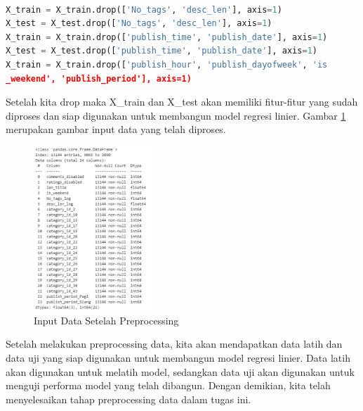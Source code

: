 \begin{lstlisting}[language=Python, caption=Drop Fitur Original]

X_train = X_train.drop(['No_tags', 'desc_len'], axis=1)
X_test = X_test.drop(['No_tags', 'desc_len'], axis=1)
X_train = X_train.drop(['publish_time', 'publish_date'], axis=1)
X_test = X_test.drop(['publish_time', 'publish_date'], axis=1)
X_train = X_train.drop(['publish_hour', 'publish_dayofweek', 'is
_weekend', 'publish_period'], axis=1)
\end{lstlisting}
\newpage
Setelah kita drop maka X\_train dan X\_test akan memiliki fitur-fitur yang sudah diproses dan siap digunakan untuk membangun model regresi linier. Gambar \ref{fig:input_data} merupakan gambar input data yang telah diproses.

\begin{figure}[ht]
    \centering
    \includegraphics[width=0.4\textwidth]{gambar/input_data.png}
    \caption{Input Data Setelah Preprocessing}
    \label{fig:input_data}
\end{figure}

Setelah melakukan preprocessing data, kita akan mendapatkan data latih dan data uji yang siap digunakan untuk membangun model regresi linier. Data latih akan digunakan untuk melatih model, sedangkan data uji akan digunakan untuk menguji performa model yang telah dibangun. Dengan demikian, kita telah menyelesaikan tahap preprocessing data dalam tugas ini.